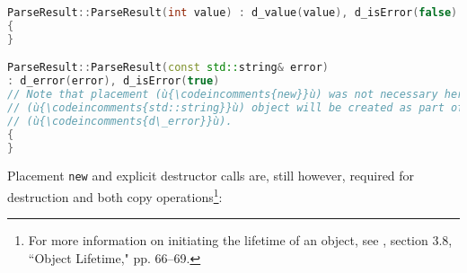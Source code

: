 %
\begin{lstlisting}[language=C++]
ParseResult::ParseResult(int value) : d_value(value), d_isError(false)
{
}

ParseResult::ParseResult(const std::string& error)
: d_error(error), d_isError(true)
// Note that placement (ù{\codeincomments{new}}ù) was not necessary here because a new
// (ù{\codeincomments{std::string}}ù) object will be created as part of the initialization of
// (ù{\codeincomments{d\_error}}ù).
{
}
\end{lstlisting}


\noindent Placement \lstinline!new! and explicit destructor calls are, still however,
required for destruction and both copy operations{\cprotect\footnote{For
more information on initiating the lifetime of an object, see \cite{iso14}, section 3.8, ``Object Lifetime," pp. 66--69.}}:

